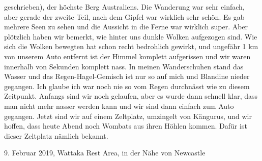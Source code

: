 \documentclass[11pt]{book}
\begin{document}
geschrieben), der höchste Berg Australiens. Die Wanderung war sehr einfach, aber gerade der zweite Teil, nach dem Gipfel war wirklich 
sehr schön. Es gab mehrere Seen zu sehen und die Aussicht in die Ferne war wirklich super. Aber plötzlich haben wir bemerkt, wie 
hinter uns dunkle Wolken aufgezogen sind. Wie sich die Wolken bewegten hat schon recht bedrohlich gewirkt, und ungefähr 1 km 
von unserem Auto entfernt ist der Himmel komplett aufgerissen und wir waren innerhalb von Sekunden komplett nass. In meinen Wanderschuhen 
stand das Wasser und das Regen-Hagel-Gemisch ist nur so auf mich und Blandine nieder gegangen. Ich glaube ich war noch nie so 
vom Regen durchnässt wie zu diesem Zeitpunkt. Anfangs sind wir noch gelaufen, aber es wurde dann schnell klar, dass man nicht mehr 
nasser werden kann und wir sind dann einfach zum Auto gegangen. 
Jetzt sind wir auf einem Zeltplatz, umzingelt von Kängurus, und wir hoffen, dass heute Abend noch Wombats aus ihren Höhlen kommen. 
Dafür ist dieser Zeltplatz nämlich bekannt.
 
9. Februar 2019, Wattaka Rest Area, in der Nähe von Newcastle
\end{document}
